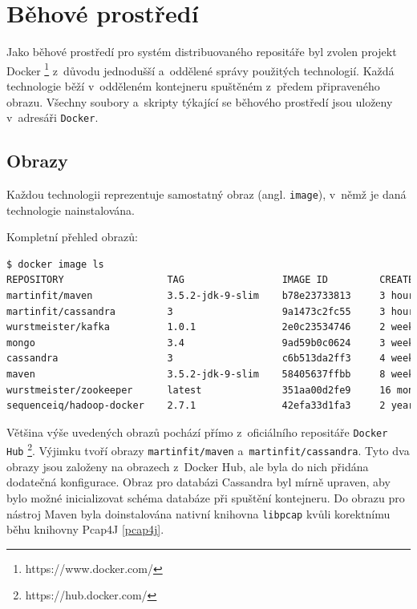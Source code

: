 \chapter{Běhové prostředí} \label{dockerEnv}
Jako běhové prostředí pro systém distribuovaného repositáře byl zvolen projekt Docker \footnote{https://www.docker.com/} z~důvodu jednodušší a~oddělené správy použitých technologií. Každá technologie běží v~odděleném kontejneru spuštěném z~předem připraveného obrazu. Všechny soubory a~skripty týkající se běhového prostředí jsou uloženy v~adresáři \texttt{Docker}.

\section{Obrazy}
Každou technologii reprezentuje samostatný obraz (angl. \texttt{image}), v~němž je daná technologie nainstalována.

\vspace{0.5cm}
\noindent Kompletní přehled obrazů:

\begin{lstlisting}[language=bash,basicstyle={\small\ttfamily}]
$ docker image ls
REPOSITORY                  TAG                 IMAGE ID         CREATED          SIZE
martinfit/maven             3.5.2-jdk-9-slim    b78e23733813     3 hours ago      449MB
martinfit/cassandra         3                   9a1473c2fc55     3 hours ago      323MB
wurstmeister/kafka          1.0.1               2e0c23534746     2 weeks ago      330MB
mongo                       3.4                 9ad59b0c0624     3 weeks ago      360MB
cassandra                   3                   c6b513da2ff3     4 weeks ago      323MB
maven                       3.5.2-jdk-9-slim    58405637ffbb     8 weeks ago      392MB
wurstmeister/zookeeper      latest              351aa00d2fe9     16 months ago    478MB
sequenceiq/hadoop-docker    2.7.1               42efa33d1fa3     2 years ago      1.76GB
\end{lstlisting}

\noindent Většina výše uvedených obrazů pochází přímo z~oficiálního repositáře \texttt{Docker Hub} \footnote{https://hub.docker.com/}. Výjimku tvoří obrazy \texttt{martinfit/maven} a~\texttt{martinfit/cassandra}. Tyto dva obrazy jsou založeny na obrazech z~Docker Hub, ale byla do nich přidána dodatečná konfigurace. Obraz pro databázi Cassandra byl mírně upraven, aby bylo možné inicializovat schéma databáze při spuštění kontejneru. Do obrazu pro nástroj Maven byla doinstalována nativní knihovna \texttt{libpcap} kvůli korektnímu běhu knihovny Pcap4J \ref{pcap4j}.

